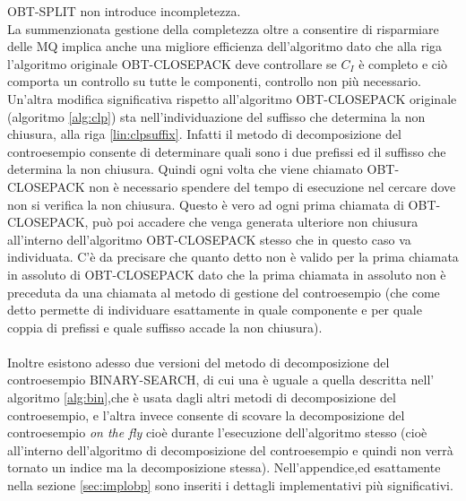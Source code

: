 OBT-SPLIT non introduce incompletezza.\\ La summenzionata gestione della completezza oltre a consentire di risparmiare delle \ac{MQ}  implica anche una migliore efficienza dell'algoritmo dato che alla riga   l'algoritmo originale OBT-CLOSEPACK deve controllare se $C_I$ è completo e ciò comporta un controllo su tutte le componenti, controllo non più necessario.\\
Un'altra modifica significativa rispetto all'algoritmo OBT-CLOSEPACK originale (algoritmo \ref{alg:clp}) sta nell'individuazione del suffisso che determina la non chiusura, alla riga \ref{lin:clpsuffix}. Infatti il metodo di decomposizione del controesempio consente di determinare quali sono i due prefissi ed il suffisso che determina la non chiusura. Quindi ogni volta che viene chiamato OBT-CLOSEPACK non è necessario spendere del tempo di esecuzione nel cercare dove non si verifica la non chiusura. Questo è vero ad ogni prima chiamata di OBT-CLOSEPACK, può poi accadere che venga generata ulteriore non chiusura all'interno dell'algoritmo OBT-CLOSEPACK stesso che in questo caso va individuata. C'è da precisare che quanto detto non è valido per la prima chiamata in assoluto di OBT-CLOSEPACK dato che la prima chiamata in assoluto non è preceduta da una chiamata al metodo di gestione del controesempio (che come detto permette di individuare esattamente in quale componente e per quale coppia di prefissi e quale suffisso accade la non chiusura). \\\\
Inoltre esistono adesso due versioni del metodo di decomposizione del controesempio BINARY-SEARCH, di cui una è uguale a quella descritta nell' algoritmo  \ref{alg:bin},che è usata dagli altri metodi di decomposizione del controesempio, e l'altra  invece consente di scovare la decomposizione del controesempio \textit{on the fly} cioè durante l'esecuzione dell'algoritmo stesso (cioè all'interno dell'algoritmo di decomposizione del controesempio e quindi non verrà tornato un indice ma la decomposizione stessa).
Nell'appendice,ed esattamente nella sezione \ref{sec:implobp} sono inseriti i dettagli implementativi più significativi.    